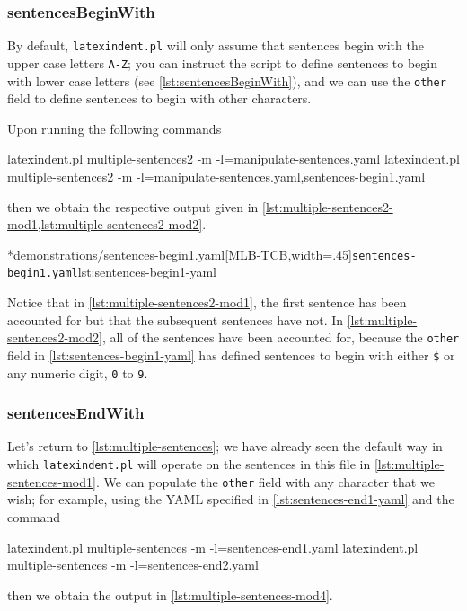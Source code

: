 \subsubsection{sentencesBeginWith}
	By default, \texttt{latexindent.pl} will only assume that sentences begin with the
	upper case letters \texttt{A-Z}; you can instruct the script to define
	sentences to begin with lower case letters (see \cref{lst:sentencesBeginWith}), and we can
	use the \texttt{other} field to define sentences to begin with other
	characters.


	Upon running the following commands
	\begin{widepage}
		\begin{commandshell}
latexindent.pl multiple-sentences2 -m -l=manipulate-sentences.yaml
latexindent.pl multiple-sentences2 -m -l=manipulate-sentences.yaml,sentences-begin1.yaml
\end{commandshell}
	\end{widepage}
	then we obtain the respective output given in \cref{lst:multiple-sentences2-mod1,lst:multiple-sentences2-mod2}.

	\begin{cmhtcbraster}[
			raster force size=false,
			raster column 1/.style={add to width=1cm},
		]
		\cmhlistingsfromfile[style=yaml-LST]*{demonstrations/sentences-begin1.yaml}[MLB-TCB,width=.45\textwidth]{\texttt{sentences-begin1.yaml}}{lst:sentences-begin1-yaml}
	\end{cmhtcbraster}
	Notice that in \cref{lst:multiple-sentences2-mod1}, the first sentence has been accounted for but
	that the subsequent sentences have not. In \cref{lst:multiple-sentences2-mod2}, all of the
	sentences have been accounted for, because the \texttt{other} field in
	\cref{lst:sentences-begin1-yaml} has defined sentences to begin with either
	\lstinline!$! or any numeric digit, \texttt{0} to
	\texttt{9}.

\subsubsection{sentencesEndWith}
	Let's return to \vref{lst:multiple-sentences}; we have already seen the default way in
	which \texttt{latexindent.pl} will operate on the sentences in this file in
	\vref{lst:multiple-sentences-mod1}. We can populate the \texttt{other} field with
	any character that we wish; for example, using the YAML specified in
	\cref{lst:sentences-end1-yaml} and the command
	\begin{commandshell}
latexindent.pl multiple-sentences -m -l=sentences-end1.yaml
latexindent.pl multiple-sentences -m -l=sentences-end2.yaml
\end{commandshell}
	then we obtain the output in \cref{lst:multiple-sentences-mod4}.

